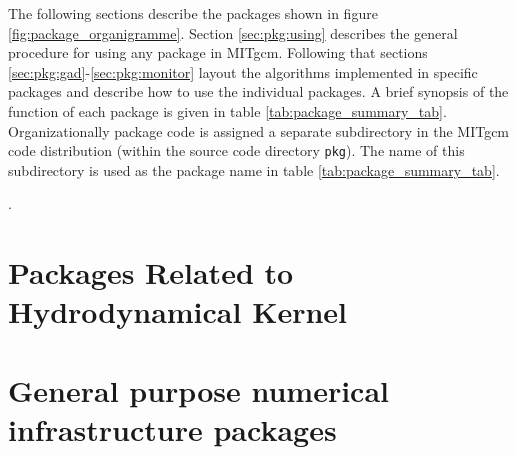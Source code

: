 The following sections describe the packages shown in
figure \ref{fig:package_organigramme}. Section \ref{sec:pkg:using}
describes the general procedure for using any package in MITgcm.
Following that sections \ref{sec:pkg:gad}-\ref{sec:pkg:monitor}
layout the algorithms implemented in specific packages
and describe how to use the individual packages. A brief synopsis of the
function of each package is given in table \ref{tab:package_summary_tab}.
Organizationally package code is assigned a
separate subdirectory in the MITgcm code distribution
(within the source code directory \texttt{pkg}).
The name of this subdirectory is used as the package name in
table \ref{tab:package_summary_tab}.


\begin{table}
\caption{~}
\label{tab:package_summary_tab}.
\end{table}

\newpage


\newpage
\section{Packages Related to Hydrodynamical Kernel}


\newpage


\newpage


\newpage


\newpage


\newpage
\section{General purpose numerical infrastructure packages}


\newpage


\newpage


\newpage

